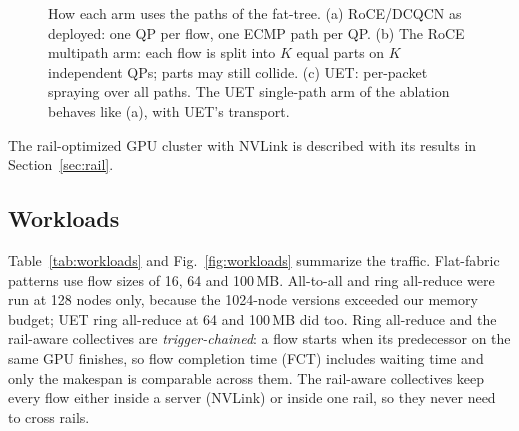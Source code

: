 \documentclass[conference]{IEEEtran}
\begin{document}
\begin{figure}[t]
{}
\caption{How each arm uses the paths of the fat-tree. (a) RoCE/DCQCN as
deployed: one QP per flow, one ECMP path per QP. (b) The RoCE multipath arm:
each flow is split into $K$ equal parts on $K$ independent QPs; parts may
still collide. (c) UET: per-packet spraying over all paths. The UET
single-path arm of the ablation behaves like (a), with UET's transport.}
\label{fig:lb}
\end{figure}
\fi

The rail-optimized GPU cluster with NVLink is described with its results in
Section~\ref{sec:rail}.

\subsection{Workloads}
Table~\ref{tab:workloads} and Fig.~\ref{fig:workloads} summarize the traffic.
Flat-fabric patterns use flow sizes of 16, 64 and 100\,MB. All-to-all and ring
all-reduce were run at 128 nodes only, because the 1024-node versions exceeded
our memory budget; UET ring all-reduce at 64 and 100\,MB did too. Ring
all-reduce and the rail-aware collectives are \emph{trigger-chained}: a flow
starts when its predecessor on the same GPU finishes, so flow completion time
(FCT) includes waiting time and only the makespan is comparable across them.
The rail-aware collectives keep every flow either inside a server (NVLink) or
inside one rail, so they never need to cross rails.
\end{document}
